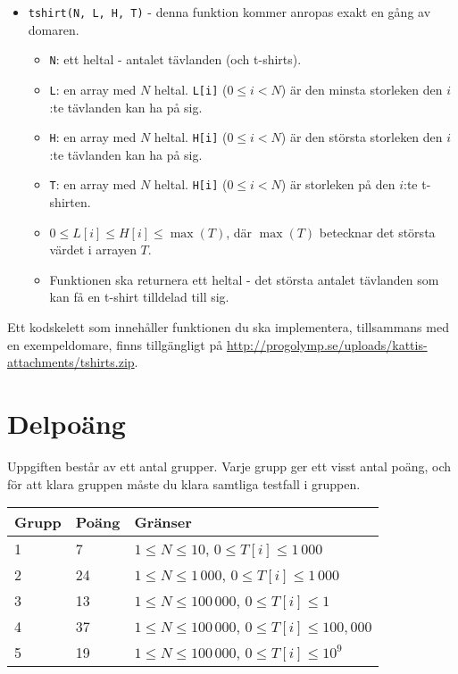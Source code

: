 \begin{itemize} 
  \item \texttt{tshirt(N, L, H, T)} - denna funktion kommer anropas exakt en gång av domaren.
  \begin{itemize}
    \item \texttt{N}: ett heltal - antalet tävlanden (och t-shirts).
    \item \texttt{L}: en array med $N$ heltal. \texttt{L[i]} ($0 \le i < N$) är den minsta storleken den $i$:te tävlanden kan ha på sig.
    \item \texttt{H}: en array med $N$ heltal. \texttt{H[i]} ($0 \le i < N$) är den största storleken den $i$:te tävlanden kan ha på sig.
    \item \texttt{T}: en array med $N$ heltal. \texttt{H[i]} ($0 \le i < N$) är storleken på den $i$:te t-shirten.
    \item $0 \le L[i] \le H[i] \le \max(T)$, där $\max(T)$ betecknar det största värdet i arrayen $T$.
    \item Funktionen ska returnera ett heltal - det största antalet tävlanden som kan få en t-shirt tilldelad till sig.
  \end{itemize}
\end{itemize}

Ett kodskelett som innehåller funktionen du ska implementera, tillsammans med en exempeldomare, finns tillgängligt på
\url{http://progolymp.se/uploads/kattis-attachments/tshirts.zip}.


\section*{Delpoäng}
Uppgiften består av ett antal grupper. Varje grupp ger ett visst antal poäng, och för att klara
gruppen måste du klara samtliga testfall i gruppen.

\begin{tabular}{|l|l|l|}
  \hline
  \textbf{Grupp} & \textbf{Poäng} & \textbf{Gränser} \\ \hline
  1 & 7 & $1 \le N \le 10$, $0 \le T[i] \le 1\,000$ \\ \hline
  2 & 24 & $1 \le N \le 1\,000$, $0 \le T[i] \le 1\,000$ \\ \hline
  3 & 13 & $1 \le N \le 100\,000$, $0 \le T[i] \le 1$ \\ \hline
  4 & 37 & $1 \le N \le 100\,000$, $0 \le T[i] \le 100,000$ \\ \hline
  5 & 19 & $1 \le N \le 100\,000$, $0 \le T[i] \le 10^9$ \\ \hline
\end{tabular}

